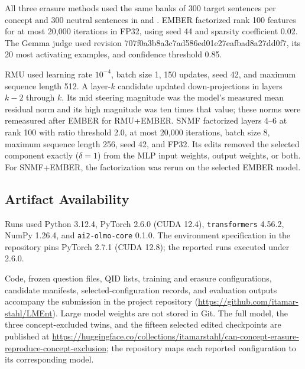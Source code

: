 All three erasure methods used the same banks of 300 target sentences per
concept and 300 neutral sentences in
 and
. EMBER factorized rank 100
features for at most 20,000 iterations in FP32, using seed 44 and sparsity
coefficient 0.02. The Gemma judge used revision
{\scriptsize\ttfamily 707f0a3b8a3c7ad586ed01e27eafbad8a27dd0f7}, its 20 most activating
examples, and confidence threshold 0.85.

RMU used learning rate $10^{-4}$, batch size 1, 150 updates, seed 42, and
maximum sequence length 512. A layer-$k$ candidate updated down-projections in
layers $k-2$ through $k$. Its mid steering magnitude was the model's measured
mean residual norm and its high magnitude was ten times that value; these
norms were remeasured after EMBER for RMU+EMBER. SNMF factorized layers 4--6
at rank 100 with ratio threshold 2.0, at most 20,000 iterations, batch size 8,
maximum sequence length 256, seed 42, and FP32. Its edits removed the selected
component exactly ($\delta=1$) from the MLP input weights, output weights, or
both. For SNMF+EMBER, the factorization was rerun on the selected EMBER model.



\subsection{Artifact Availability}

Runs used Python 3.12.4, PyTorch 2.6.0 (CUDA 12.4), \texttt{transformers}
4.56.2, NumPy 1.26.4, and \texttt{ai2-olmo-core} 0.1.0. The environment
specification in the repository pins PyTorch 2.7.1 (CUDA 12.8); the reported
runs executed under 2.6.0.

Code, frozen question files, QID lists, training and erasure configurations,
candidate manifests, selected-configuration records, and evaluation outputs
accompany the submission in the project repository
(\url{https://github.com/itamar-stahl/LMEnt}). Large model weights are not
stored in Git. The full model, the three concept-excluded twins, and the
fifteen selected edited checkpoints are published at
\url{https://huggingface.co/collections/itamarstahl/can-concept-erasure-reproduce-concept-exclusion};
the repository maps each reported configuration to its corresponding model.